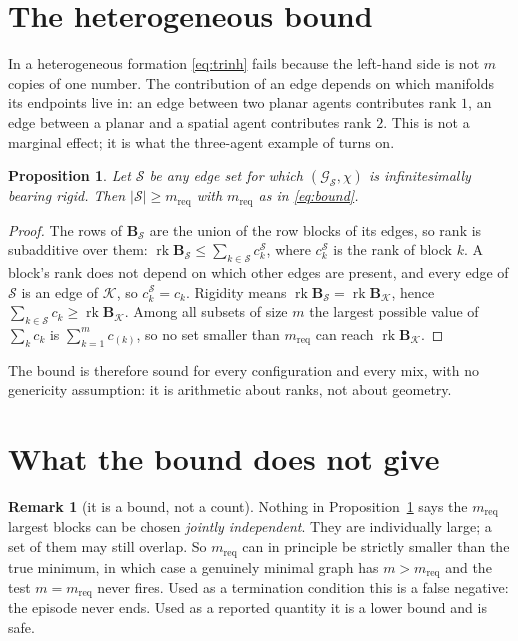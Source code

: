 \documentclass[11pt,a4paper]{article}
\theoremstyle{plain}
\newtheorem{proposition}[theorem]{Proposition}
\theoremstyle{definition}
\newtheorem{remark}[theorem]{Remark}
\newcommand{\rank}{\operatorname{rk}}
\begin{document}
\section{The heterogeneous bound}

In a heterogeneous formation \eqref{eq:trinh} fails because the left-hand side
is not $m$ copies of one number. The contribution of an edge depends on which
manifolds its endpoints live in: an edge between two planar agents contributes
rank $1$, an edge between a planar and a spatial agent contributes rank $2$.
This is not a marginal effect; it is what the three-agent example of \cite{note_dof} turns on.

\begin{proposition}\label{prop:bound}
Let $\mathcal S$ be any edge set for which $(\mathcal G_{\mathcal S},\chi)$ is
infinitesimally bearing rigid. Then $|\mathcal S|\ge m_{\text{req}}$ with
$m_{\text{req}}$ as in \eqref{eq:bound}.
\end{proposition}

\begin{proof}
The rows of $\mathbf B_{\mathcal S}$ are the union of the row blocks of its
edges, so rank is subadditive over them:
$\rank\mathbf B_{\mathcal S}\le\sum_{k\in\mathcal S}c_k^{\mathcal S}$, where
$c_k^{\mathcal S}$ is the rank of block $k$. A block's rank does not depend on
which other edges are present, and every edge of $\mathcal S$ is an edge of
$\mathcal K$, so $c_k^{\mathcal S}=c_k$. Rigidity means
$\rank\mathbf B_{\mathcal S}=\rank\mathbf B_{\mathcal K}$, hence
$\sum_{k\in\mathcal S}c_k\ge\rank\mathbf B_{\mathcal K}$. Among all subsets of
size $m$ the largest possible value of $\sum_{k}c_k$ is
$\sum_{k=1}^{m}c_{(k)}$, so no set smaller than $m_{\text{req}}$ can reach
$\rank\mathbf B_{\mathcal K}$.
\end{proof}

The bound is therefore sound for every configuration and every mix, with no
genericity assumption: it is arithmetic about ranks, not about geometry.

\section{What the bound does not give}

\begin{remark}[it is a bound, not a count]\label{rem:notcount}
Nothing in Proposition~\ref{prop:bound} says the $m_{\text{req}}$ largest blocks
can be chosen \emph{jointly independent}. They are individually large; a set of
them may still overlap. So $m_{\text{req}}$ can in principle be strictly smaller
than the true minimum, in which case a genuinely minimal graph has
$m>m_{\text{req}}$ and the test $m=m_{\text{req}}$ never fires. Used as a
termination condition this is a false negative: the episode never ends. Used as
a reported quantity it is a lower bound and is safe.
\end{remark}
\end{document}
